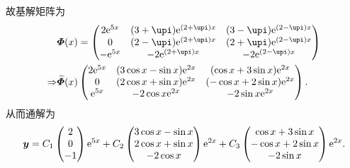 \begin{solution}
  故基解矩阵为
  \[\begin{split}
  &\bmitPhi(x)=\begin{pmatrix}2\e^{5x}&(3+\upi)\e^{(2+\upi)x}&(3-\upi)\e^{(2-\upi)x}\\0&(2-\upi)\e^{(2+\upi)x}&(2+\upi)\e^{(2-\upi)x}\\-\e^{5x}&-2\e^{(2+\upi)x}&-2\e^{(2-\upi)x}\end{pmatrix}\\
  \Rightarrow&\widetilde{\bmitPhi}(x)\begin{pmatrix}2\e^{5x}&(3\cos x-\sin x)\e^{2x}&(\cos x+3\sin x)\e^{2x}\\0&(2\cos x+\sin x)\e^{2x}&(-\cos x+2\sin x)\e^{2x}\\\e^{5x}&-2\cos x\e^{2x}&-2\sin x\e^{2x}\end{pmatrix}.
  \end{split}\]
  从而通解为
  \[\bm{y} = C_1\begin{pmatrix}2\\0\\-1\end{pmatrix}\mathrm{e}^{5x}
    + C_2\begin{pmatrix}3\cos x-\sin x\\2\cos x+\sin x\\-2\cos x\end{pmatrix}\mathrm{e}^{2x}
    + C_3\begin{pmatrix}\cos x+3\sin x\\-\cos x+2\sin x\\-2\sin x\end{pmatrix}\mathrm{e}^{2x}.\]


\end{solution}
